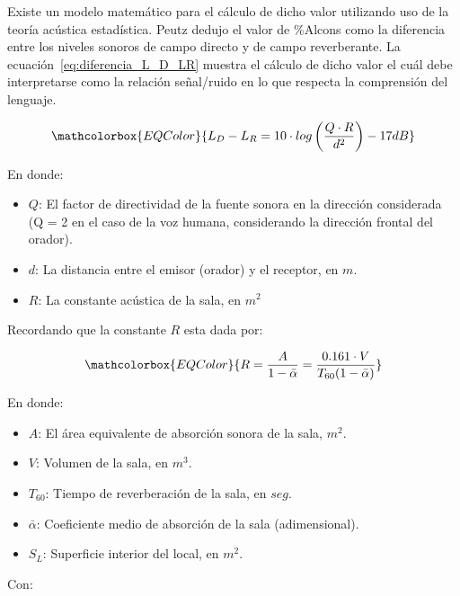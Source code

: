\par Existe un modelo matemático para el cálculo de dicho valor utilizando uso de la teoría acústica estadística. Peutz dedujo el valor de \%Alcons como la diferencia entre los niveles sonoros de campo directo y de campo reverberante. La ecuación~\eqref{eq:diferencia_L_D_LR} muestra el cálculo de dicho valor el cuál debe interpretarse como la relación señal/ruido en lo que respecta la comprensión del lenguaje.

\begin{equation}
   \mathcolorbox{EQColor}{ L_D - L_R = 10 \cdot log \left(\frac{Q \cdot R}{ d^2} \right) - 17dB }
    \label{eq:diferencia_L_D_LR}
\end{equation}

\par En donde:
\begin{itemize}
    \item $Q$: El factor de directividad de la fuente sonora en la dirección considerada (Q = 2 en el caso de la voz humana, considerando la dirección frontal del orador).
    \item $d$: La distancia entre el emisor (orador) y el receptor, en $m$.
    \item $R$: La constante acústica de la sala, en $m^2$
\end{itemize}

\par Recordando que la constante $R$ esta dada por:

\begin{equation}
   \mathcolorbox{EQColor}{ R  = \frac{A}{1- \bar{\alpha}} = \frac{0.161 \cdot V}{T_{60} (1- \bar{\alpha})} }
\end{equation}

\par En donde:
\begin{itemize}
    \item $A$: El área equivalente de absorción sonora de la sala, $m^2$.
    \item $V$: Volumen de la sala, en $m^3$.
    \item $T_{60}$: Tiempo de reverberación de la sala, en $seg$.
    \item $\bar{\alpha}$: Coeficiente medio de absorción de la sala (adimensional).
    \item $S_L$: Superficie interior del local, en $m^2$.
\end{itemize}

\par Con:

